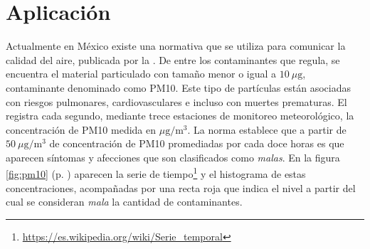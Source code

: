 \documentclass[paper=leter, fontsize=11pt]{scrartcl}
\begin{document}
\section{Aplicación}

Actualmente en México existe una normativa que se utiliza para comunicar la calidad del aire, publicada por la \citet{semarnat}. De entre los contaminantes que regula, se encuentra el material particulado con tamaño menor o igual a $10\ \mu\text{g}$, contaminante denominado como PM10. Este tipo de partículas están asociadas con riesgos pulmonares, cardiovasculares e incluso con muertes prematuras. El \citet{aireNL} registra cada segundo, mediante trece estaciones de monitoreo meteorológico, la concentración de PM10 medida en $\mu\text{g} / \text{m}^3$. La norma establece que a partir de $50\ \mu\text{g} / \text{m}^3$ de concentración de PM10 promediadas por cada doce horas es que aparecen síntomas y afecciones que son clasificados como \emph{malas}. En la figura \ref{fig:pm10} (p. \pageref{fig:pm10}) aparecen la serie de tiempo\footnote{\url{https://es.wikipedia.org/wiki/Serie_temporal}} y el histograma de estas concentraciones, acompañadas por una recta roja que indica el nivel a partir del cual se consideran \emph{mala} la cantidad de contaminantes. 
\end{document}
